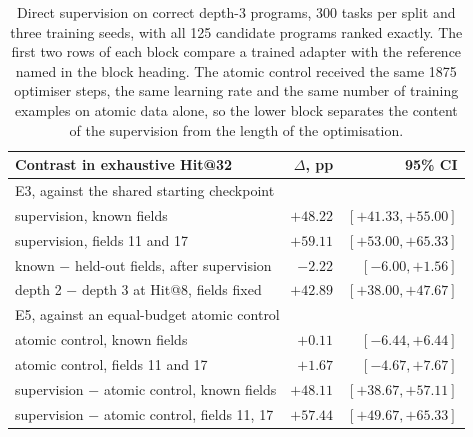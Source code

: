 \begin{table}[!tbh]
\centering\scriptsize\setlength{\tabcolsep}{4pt}
\begin{tabular}{|l|r|r|}
\hline
\textbf{Contrast in exhaustive Hit@32} & \textbf{$\Delta$, pp} & \textbf{95\% CI} \\
\hline
\multicolumn{3}{|l|}{E3, against the shared starting checkpoint} \\ \hline
supervision, known fields & $+48.22$ & $[+41.33, +55.00]$ \\ \hline
supervision, fields 11 and 17 & $+59.11$ & $[+53.00, +65.33]$ \\ \hline
known $-$ held-out fields, after supervision & $-2.22$ & $[-6.00, +1.56]$ \\ \hline
depth 2 $-$ depth 3 at Hit@8, fields fixed & $+42.89$ & $[+38.00, +47.67]$ \\ \hline
\multicolumn{3}{|l|}{E5, against an equal-budget atomic control} \\ \hline
atomic control, known fields & $+0.11$ & $[-6.44, +6.44]$ \\ \hline
atomic control, fields 11 and 17 & $+1.67$ & $[-4.67, +7.67]$ \\ \hline
supervision $-$ atomic control, known fields & $+48.11$ & $[+38.67, +57.11]$ \\ \hline
supervision $-$ atomic control, fields 11, 17 & $+57.44$ & $[+49.67, +65.33]$ \\ \hline
\end{tabular}
\caption{Direct supervision on correct depth-3 programs, 300 tasks per split and
three training seeds, with all 125 candidate programs ranked exactly. The first two
rows of each block compare a trained adapter with the reference named in the block
heading. The atomic control received the same 1875 optimiser steps, the same
learning rate and the same number of training examples on atomic data alone, so
the lower block separates the content of the supervision from the length of the
optimisation.}
\label{tab:capacity}
\end{table}
